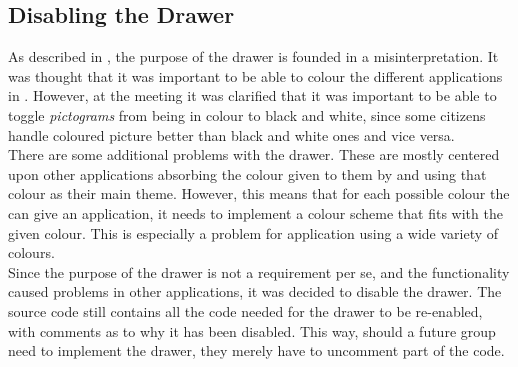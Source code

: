 \subsection{Disabling the Drawer}
As described in , the purpose of the drawer is founded in a misinterpretation.
It was thought that it was important to be able to colour the different applications in \launcher.
However, at the meeting it was clarified that it was important to be able to toggle \textit{pictograms} from being in colour to black and white, since some citizens handle coloured picture better than black and white ones and vice versa.\\

There are some additional problems with the drawer.
These are mostly centered upon other applications absorbing the colour given to them by \launcher and using that colour as their main theme.
However, this means that for each possible colour the \launcher can give an application, it needs to implement a colour scheme that fits with the given colour.
This is especially a problem for application using a wide variety of colours.\\

Since the purpose of the drawer is not a requirement per se, and the functionality caused problems in other applications, it was decided to disable the drawer.
The source code still contains all the code needed for the drawer to be re-enabled, with comments as to why it has been disabled.
This way, should a future group need to implement the drawer, they merely have to uncomment part of the code.